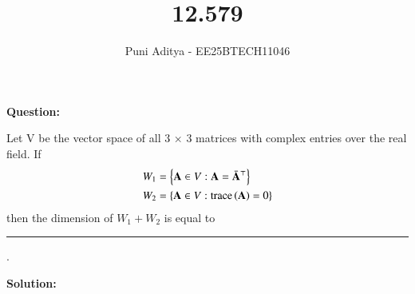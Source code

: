 \documentclass[journal]{IEEEtran}
\begin{document}
\title{12.579}
\author{Puni Aditya - EE25BTECH11046}
\maketitle

\textbf{Question:}

Let V be the vector space of all 3 × 3 matrices with complex entries over the real
field. If
\begin{align*}
    W_1 &= \left\{\mathbf{A} \in V : \mathbf{A} = \bar{\mathbf{A}}^\top\right\} \\
    W_2 &= \left\{\mathbf{A} \in V : \text{trace} \left(\mathbf{A}\right) = 0\right\}
\end{align*}
then the dimension of $W_1 + W_2$ is equal to \rule{2cm}{0.4pt}.

\textbf{Solution:}
\end{document}
